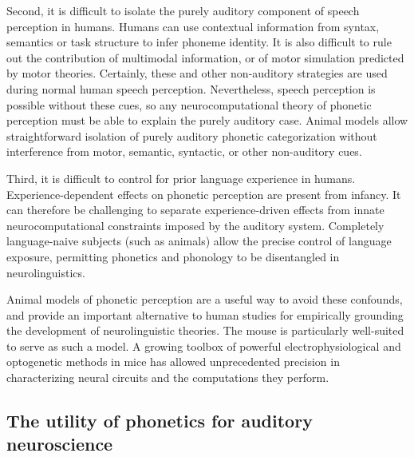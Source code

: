 Second, it is difficult to isolate the purely auditory component of speech perception in humans. Humans can use contextual information from syntax, semantics or task structure to infer phoneme identity\cite{Fox2016,Schouten2003}. It is also difficult to rule out the contribution of multimodal information\cite{Rosenblum2008}, or of motor simulation predicted by motor theories. Certainly, these and other non-auditory strategies are used during normal human speech perception. Nevertheless, speech perception is possible without these cues, so any neurocomputational theory of phonetic perception must be able to explain the purely auditory case. Animal models allow straightforward isolation of purely auditory phonetic categorization without interference from motor, semantic, syntactic, or other non-auditory cues.

Third, it is difficult to control for prior language experience in humans. Experience-dependent effects on phonetic perception are present from infancy\cite{Kuhl1992}. It can therefore be challenging to separate experience-driven effects from innate neurocomputational constraints imposed by the auditory system. Completely language-naive subjects (such as animals) allow the precise control of language exposure, permitting phonetics and phonology to be disentangled in neurolinguistics.

Animal models of phonetic perception are a useful way to avoid these confounds, and provide an important alternative to human studies for empirically grounding the development of neurolinguistic theories. The mouse is particularly well-suited to serve as such a model. A growing toolbox of powerful electrophysiological and optogenetic methods in mice has allowed unprecedented precision in characterizing neural circuits and the computations they perform.

\subsection{The utility of phonetics for auditory neuroscience}

